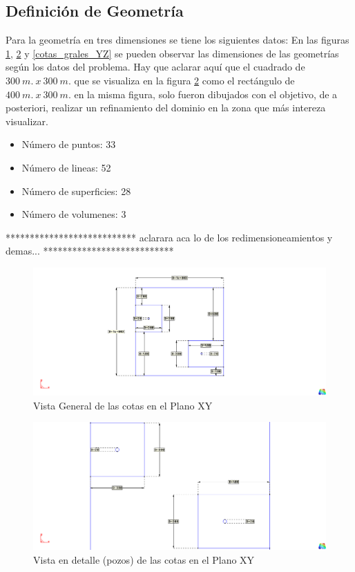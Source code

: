 \documentclass[10pt,a4paper,final]{article}
\begin{document}
\subsection{Definición de Geometría}
Para la geometría en tres dimensiones se tiene los siguientes datos:
En las figuras \ref{cotas_superiores_generalesXY}, \ref{cotas_superiores_detallesXY} y \ref{cotas_grales_YZ} se pueden observar
las dimensiones de las geometrías según los datos del problema. Hay que aclarar aquí que el cuadrado de $300~m.~x~300~m.$ que se visualiza
en la figura \ref{cotas_superiores_detallesXY} como el rectángulo de $400~m.~x~300~m.$ en la misma figura, solo fueron dibujados con el
objetivo, de a posteriori, realizar un refinamiento del dominio en la zona que más intereza visualizar.\\
\begin{itemize}
\item Número de puntos: 33
\item Número de lineas: 52
\item Número de superficies: 28
\item Número de volumenes: 3
\end{itemize}
***************************
aclarara aca lo de los redimensioneamientos y demas...
***************************
\begin{figure}[tbhp]
\centerline{\includegraphics[scale=0.75]{img/cotas_superiores_generalesXY}}
\caption{Vista General de las cotas en el Plano XY}
\label{cotas_superiores_generalesXY}
\end{figure}

%
\begin{figure}[tbhp]
\centerline{\includegraphics[scale=0.75]{img/cotas_superiores_detallesXY}}
\caption{Vista en detalle (pozos) de las cotas en el Plano XY}
\label{cotas_superiores_detallesXY}
\end{figure}
%
\end{document}

